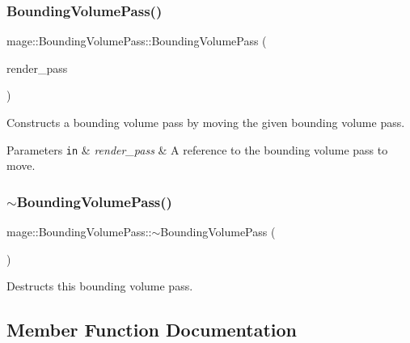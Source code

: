 \subsubsection{\texorpdfstring{Bounding\+Volume\+Pass()}{BoundingVolumePass()}\hspace{0.1cm}{\footnotesize\ttfamily [3/3]}}
{\footnotesize\ttfamily mage\+::\+Bounding\+Volume\+Pass\+::\+Bounding\+Volume\+Pass (\begin{DoxyParamCaption}\item[{\hyperlink{classmage_1_1_bounding_volume_pass}{Bounding\+Volume\+Pass} \&\&}]{render\+\_\+pass }\end{DoxyParamCaption})\hspace{0.3cm}{\ttfamily [default]}}

Constructs a bounding volume pass by moving the given bounding volume pass.


\begin{DoxyParams}[1]{Parameters}
\mbox{\tt in}  & {\em render\+\_\+pass} & A reference to the bounding volume pass to move. \\
\hline
\end{DoxyParams}
\hypertarget{classmage_1_1_bounding_volume_pass_a41dc433aed26f05e8b60462a6e337509}{}\label{classmage_1_1_bounding_volume_pass_a41dc433aed26f05e8b60462a6e337509} 
\subsubsection{\texorpdfstring{$\sim$\+Bounding\+Volume\+Pass()}{~BoundingVolumePass()}}
{\footnotesize\ttfamily mage\+::\+Bounding\+Volume\+Pass\+::$\sim$\+Bounding\+Volume\+Pass (\begin{DoxyParamCaption}{ }\end{DoxyParamCaption})\hspace{0.3cm}{\ttfamily [default]}}

Destructs this bounding volume pass. 

\subsection{Member Function Documentation}
\hypertarget{classmage_1_1_bounding_volume_pass_a29a98f857f8ae45a0230b96f78f2dcb9}{}\label{classmage_1_1_bounding_volume_pass_a29a98f857f8ae45a0230b96f78f2dcb9} 
